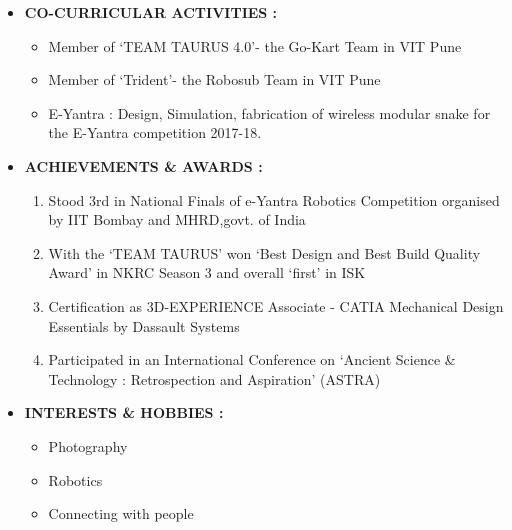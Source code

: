 \documentclass[11pt]{article}
\begin{document}
\begin{itemize}[label=$\star$]
		\bigskip
		\item	\begin{large} \textbf{CO-CURRICULAR ACTIVITIES :} \end{large}
		\begin{itemize}[label=$\bullet$]
			\item Member of `TEAM TAURUS 4.0'- the Go-Kart Team in VIT Pune
			\item Member of `Trident'- the Robosub Team in VIT Pune
			\item E-Yantra : Design, Simulation, fabrication of wireless modular snake for the E-Yantra competition 2017-18.
		\end{itemize}
		\newpage
		\item	\begin{large} \textbf{ACHIEVEMENTS \& AWARDS :} \end{large}
		\begin{enumerate}
			\item Stood 3rd in National Finals of e-Yantra Robotics Competition organised by IIT Bombay and 
			MHRD,govt. of India
			\item With the `TEAM TAURUS' won `Best Design and Best Build Quality Award' in NKRC Season 3 and overall `first' in ISK 
			\item Certification as 3D-EXPERIENCE Associate - CATIA Mechanical Design Essentials by Dassault Systems
			\item Participated in an International Conference on `Ancient Science \& Technology : Retrospection and Aspiration' (ASTRA)
		\end{enumerate}
		\bigskip
		\item	\begin{large} \textbf{INTERESTS \& HOBBIES :} \end{large}
		\begin{itemize}[label=$\bullet$]
			\item Photography
			\item Robotics
			\item Connecting with people
		\end{itemize}

\end{itemize}
\end{document}
